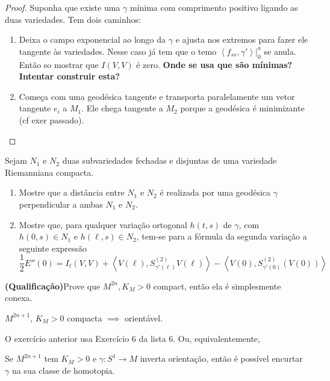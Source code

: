 \begin{proof}
Suponha que existe uma $\gamma$ mínima com comprimento positivo ligando as 
duas variedades. Tem dois caminhos:
\begin{enumerate}
\item Deixa o campo exponencial ao longo da $\gamma$ e ajusta nos extremos
para fazer ele tangente às variedades. Nesse caso já tem que o temo
$\left<f_{ss},\gamma'\right>|_{0}^a$ se anula. Então so mostrar que $I(V,V)$  é
zero. {\bf Onde se usa que são mínimas? Intentar construir esta?}
\item Começa com uma geodésica tangente e transporta paralelamente um vetor
tangente $e_i$ a  $M_1$. Ele chega tangente a  $M_2$ porque a geodésica é
minimizante (cf exer passado).
\end{enumerate}
\end{proof}

\begin{exercise}
\label{exercise-two-submanifolds}
Sejam $N_1$ e $N_2$ duas subvariedades fechadas e disjuntas de uma variedade
Riemanniana compacta.
\begin{enumerate}
\item Mostre que a distância entre $N_1$ e $N_2$ é realizada por uma geodésica
	$\gamma$ perpendicular a ambas $N_1$ e $N_2$.
\item Mostre que, para qualquer variação ortogonal $h(t,s)$ de $\gamma$, com
$h(0,s) \in N_1$ e $h(\ell,s) \in N_2$, tem-se para a fórmula da segunda
variação a seguinte expressão
$$
\frac{1}{2}E''(0)=I_{\ell}(V,V)+
\left<V(\ell),S_{\gamma'(\ell)}^{(2)}V(\ell)\right>
-\left<V(0),S^{(2)}_{\gamma'(0)}(V(0))\right>
$$
\end{enumerate}
\end{exercise}


\begin{exercise}
{\bf (Qualificação)}Prove que $M^{2n},K_M>0$ compact, então ela é simplesmente conexa.
\end{exercise}

\begin{exercise}
$M^{2n+1}$, $K_M>0$ compacta \(\implies\) orientável.
\end{exercise}

O exercício anterior usa Exercício 6 da lista 6. Ou, equivalentemente,

\begin{exercise}
Se $M^{2n+1}$ tem $K_M >0$ e $\gamma:S^1 \to M$ inverta orientação, então é
possível encurtar $\gamma$ na sua classe de homotopia.
\end{exercise}

